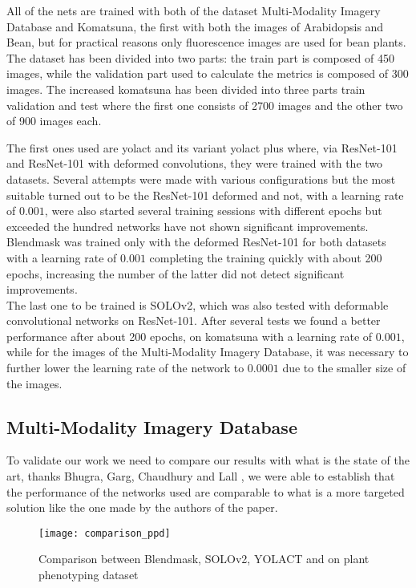 All of the nets are trained with both of the dataset Multi-Modality Imagery Database and Komatsuna, the first with both the images of Arabidopsis and Bean, 
but for practical reasons only fluorescence images are used for bean plants. The dataset has been divided into two parts: the train part is composed of 450
images, while the validation part used to calculate the metrics is composed of 300 images. The increased komatsuna has been divided into three parts train
validation and test where the first one consists of 2700 images and the other two of 900 images each. 

The first ones used are yolact and its variant yolact plus where, via ResNet-101 and ResNet-101 with deformed convolutions, they were trained with the two datasets.
Several attempts were made with various configurations but the most suitable turned out to be the ResNet-101 deformed and not, with a learning rate of $0.001$, were
also started several training sessions with different epochs but exceeded the hundred networks have not shown significant improvements.\\
Blendmask was trained only with the deformed ResNet-101 for both datasets with a learning rate of $0.001$ completing the training quickly with about 200 epochs,
increasing the number of the latter did not detect significant improvements.\\
The last one to be trained is SOLOv2, which was also tested with deformable convolutional networks on ResNet-101. After several tests we found a better performance
after about 200 epochs, on komatsuna with a learning rate of $0.001$, while for the images of the Multi-Modality Imagery Database, it was necessary to further lower
the learning rate of the network to $0.0001$ due to the smaller size of the images.


\subsection{Multi-Modality Imagery Database}
To validate our work we need to compare our results with what is the state of the art, thanks Bhugra, Garg, Chaudhury and Lall \cite{9411981}, we were able to establish that
the performance of the networks used are comparable to what is a more targeted solution like the one made by the authors of the paper.

\begin{figure}[h]
  \centering
  \texttt{[image: comparison\_ppd]}%
  \caption{Comparison between Blendmask\cite{chen2020blendmask}, SOLOv2\cite{wang2020solov2}, YOLACT\cite{bolya2019yolact} and \cite{9411981} on plant phenotyping dataset}%
\end{figure}

